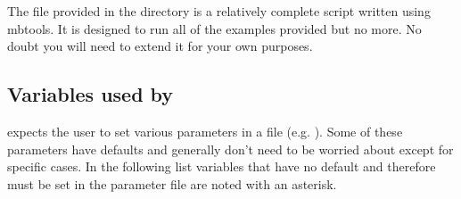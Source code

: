  The  file provided in the  directory is a relatively complete script written using mbtools. It is designed to run all of the examples provided but no more. No doubt you will need to extend it for your own purposes.

\subsection{Variables used by }

 expects the user to set various parameters in a  file (e.g. ). Some of these parameters have defaults and generally don't need to be worried about except for specific cases. In the following list variables that have no default and therefore must be set in the parameter file are noted with an asterisk.

